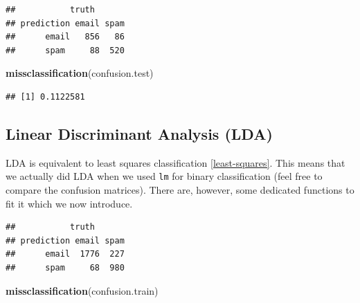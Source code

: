 \documentclass[]{book}
\newenvironment{Shaded}{\begin{snugshade}}{\end{snugshade}}
\newcommand{\CommentTok}[1]{\textcolor[rgb]{0.56,0.35,0.01}{\textit{#1}}}
\newcommand{\DataTypeTok}[1]{\textcolor[rgb]{0.13,0.29,0.53}{#1}}
\newcommand{\FloatTok}[1]{\textcolor[rgb]{0.00,0.00,0.81}{#1}}
\newcommand{\KeywordTok}[1]{\textcolor[rgb]{0.13,0.29,0.53}{\textbf{#1}}}
\newcommand{\NormalTok}[1]{#1}
\newcommand{\OperatorTok}[1]{\textcolor[rgb]{0.81,0.36,0.00}{\textbf{#1}}}
\newcommand{\StringTok}[1]{\textcolor[rgb]{0.31,0.60,0.02}{#1}}
\theoremstyle{definition}
\theoremstyle{definition}
\theoremstyle{definition}
\theoremstyle{remark}
\begin{document}
\begin{verbatim}
##           truth
## prediction email spam
##      email   856   86
##      spam     88  520
\end{verbatim}

\begin{Shaded}
\begin{Highlighting}[]
\KeywordTok{missclassification}\NormalTok{(confusion.test)}
\end{Highlighting}
\end{Shaded}

\begin{verbatim}
## [1] 0.1122581
\end{verbatim}

\hypertarget{linear-discriminant-analysis-lda}{%
\subsection{Linear Discriminant Analysis (LDA)}\label{linear-discriminant-analysis-lda}}

LDA is equivalent to least squares classification \ref{least-squares}.
This means that we actually did LDA when we used \texttt{lm} for binary classification (feel free to compare the confusion matrices).
There are, however, some dedicated functions to fit it which we now introduce.

\begin{Shaded}
\end{Shaded}

\begin{verbatim}
##           truth
## prediction email spam
##      email  1776  227
##      spam     68  980
\end{verbatim}

\begin{Shaded}
\begin{Highlighting}[]
\KeywordTok{missclassification}\NormalTok{(confusion.train)}
\end{Highlighting}
\end{Shaded}
\end{document}
